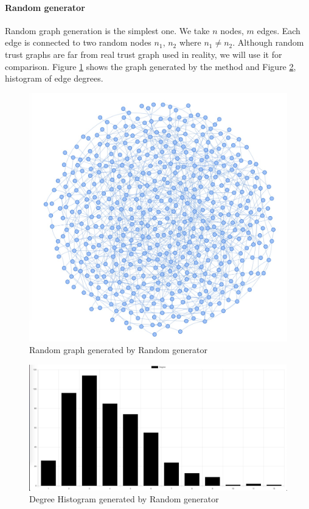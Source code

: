 \paragraph{Random generator}
Random graph generation is the simplest one. We take $n$ nodes, $m$ edges. Each edge is connected to two random nodes $n_1$, $n_2$ where $n_1 ≠ n_2$. Although random trust graphs are far from real trust graph used in reality, we will use it for comparison. Figure \ref{fig:random500graph} shows the graph generated by the method and Figure \ref{fig:random500histogram}, histogram of edge degrees.

\begin{figure}[h!]
    \includegraphics[width=\textwidth]{img/random500Graph.jpg}
    \centering
    \caption{Random graph generated by Random generator}
    \label{fig:random500graph}
\end{figure}

\begin{figure}[h!]
    \includegraphics[width=\textwidth]{img/random500Histogram.jpg}
    \centering
    \caption{Degree Histogram generated by Random generator}
    \label{fig:random500histogram}
\end{figure} 
